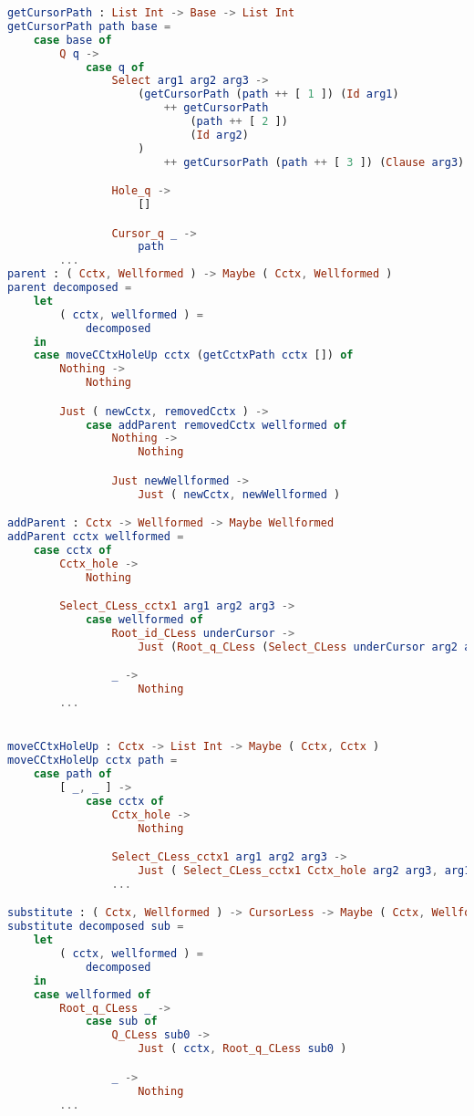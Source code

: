 \begin{lstlisting}[style=inline, language=elm, caption={Generated functions for cursor movement for the SLQ language}, label={lst:SQL-movement}]
getCursorPath : List Int -> Base -> List Int
getCursorPath path base =
    case base of
        Q q ->
            case q of
                Select arg1 arg2 arg3 ->
                    (getCursorPath (path ++ [ 1 ]) (Id arg1)
                        ++ getCursorPath
                            (path ++ [ 2 ])
                            (Id arg2)
                    )
                        ++ getCursorPath (path ++ [ 3 ]) (Clause arg3)

                Hole_q ->
                    []

                Cursor_q _ ->
                    path
        ...
parent : ( Cctx, Wellformed ) -> Maybe ( Cctx, Wellformed )
parent decomposed =
    let
        ( cctx, wellformed ) =
            decomposed
    in
    case moveCCtxHoleUp cctx (getCctxPath cctx []) of
        Nothing ->
            Nothing

        Just ( newCctx, removedCctx ) ->
            case addParent removedCctx wellformed of
                Nothing ->
                    Nothing

                Just newWellformed ->
                    Just ( newCctx, newWellformed )

addParent : Cctx -> Wellformed -> Maybe Wellformed
addParent cctx wellformed =
    case cctx of
        Cctx_hole ->
            Nothing

        Select_CLess_cctx1 arg1 arg2 arg3 ->
            case wellformed of
                Root_id_CLess underCursor ->
                    Just (Root_q_CLess (Select_CLess underCursor arg2 arg3))

                _ ->
                    Nothing
        ...


moveCCtxHoleUp : Cctx -> List Int -> Maybe ( Cctx, Cctx )
moveCCtxHoleUp cctx path =
    case path of
        [ _, _ ] ->
            case cctx of
                Cctx_hole ->
                    Nothing

                Select_CLess_cctx1 arg1 arg2 arg3 ->
                    Just ( Select_CLess_cctx1 Cctx_hole arg2 arg3, arg1 )
                ...

substitute : ( Cctx, Wellformed ) -> CursorLess -> Maybe ( Cctx, Wellformed )
substitute decomposed sub =
    let
        ( cctx, wellformed ) =
            decomposed
    in
    case wellformed of
        Root_q_CLess _ ->
            case sub of
                Q_CLess sub0 ->
                    Just ( cctx, Root_q_CLess sub0 )

                _ ->
                    Nothing
        ...
\end{lstlisting}

